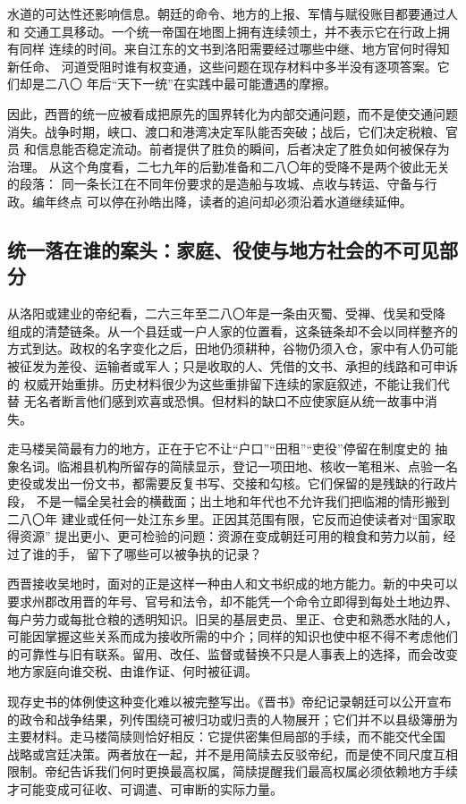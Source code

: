水道的可达性还影响信息。朝廷的命令、地方的上报、军情与赋役账目都要通过人和
交通工具移动。一个统一帝国在地图上拥有连续领土，并不表示它在行政上拥有同样
连续的时间。来自江东的文书到洛阳需要经过哪些中继、地方官何时得知新任命、
河道受阻时谁有权变通，这些问题在现存材料中多半没有逐项答案。它们却是二八〇
年后“天下一统”在实践中最可能遭遇的摩擦。

因此，西晋的统一应被看成把原先的国界转化为内部交通问题，而不是使交通问题
消失。战争时期，峡口、渡口和港湾决定军队能否突破；战后，它们决定税粮、官员
和信息能否稳定流动。前者提供了胜负的瞬间，后者决定了胜负如何被保存为治理。
从这个角度看，二七九年的后勤准备和二八〇年的受降不是两个彼此无关的段落：
同一条长江在不同年份要求的是造船与攻城、点收与转运、守备与行政。编年终点
可以停在孙皓出降，读者的追问却必须沿着水道继续延伸。

\subsection{统一落在谁的案头：家庭、役使与地方社会的不可见部分}

从洛阳或建业的帝纪看，二六三年至二八〇年是一条由灭蜀、受禅、伐吴和受降
组成的清楚链条。从一个县廷或一户人家的位置看，这条链条却不会以同样整齐的
方式到达。政权的名字变化之后，田地仍须耕种，谷物仍须入仓，家中有人仍可能
被征发为差役、运输者或军人；只是收取的人、凭借的文书、承担的线路和可申诉的
权威开始重排。历史材料很少为这些重排留下连续的家庭叙述，不能让我们代替
无名者断言他们感到欢喜或恐惧。但材料的缺口不应使家庭从统一故事中消失。

走马楼吴简最有力的地方，正在于它不让“户口”“田租”“吏役”停留在制度史的
抽象名词。临湘县机构所留存的简牍显示，登记一项田地、核收一笔租米、点验一名
吏役或发出一份文书，都需要反复书写、交接和勾核。它们保留的是残缺的行政片段，
不是一幅全吴社会的横截面；出土地和年代也不允许我们把临湘的情形搬到二八〇年
建业或任何一处江东乡里。正因其范围有限，它反而迫使读者对“国家取得资源”
提出更小、更可检验的问题：资源在变成朝廷可用的粮食和劳力以前，经过了谁的手，
留下了哪些可以被争执的记录？

西晋接收吴地时，面对的正是这样一种由人和文书织成的地方能力。新的中央可以
要求州郡改用晋的年号、官号和法令，却不能凭一个命令立即得到每处土地边界、
每户劳力或每批仓粮的透明知识。旧吴的基层吏员、里正、仓吏和熟悉水陆的人，
可能因掌握这些关系而成为接收所需的中介；同样的知识也使中枢不得不考虑他们
的可靠性与旧有联系。留用、改任、监督或替换不只是人事表上的选择，而会改变
地方家庭向谁交税、由谁作证、何时被征调。

现存史书的体例使这种变化难以被完整写出。《晋书》帝纪记录朝廷可以公开宣布
的政令和战争结果，列传围绕可被归功或归责的人物展开；它们并不以县级簿册为
主要材料。走马楼简牍则恰好相反：它提供密集但局部的手续，而不能交代全国
战略或宫廷决策。两者放在一起，并不是用简牍去反驳帝纪，而是使不同尺度互相
限制。帝纪告诉我们何时更换最高权属，简牍提醒我们最高权属必须依赖地方手续
才可能变成可征收、可调遣、可审断的实际力量。

